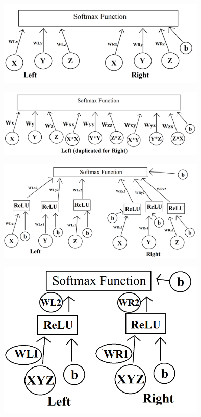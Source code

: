 \documentclass[]{report}
\begin{document}
\begin{minipage}{\linewidth}
	\begin{minipage}{0.49\textwidth}
		\centering
		\includegraphics[width=0.75\textwidth]{../images/original}
	\end{minipage}
	\hfill
	\begin{minipage}{0.49\textwidth}
		\centering
		\includegraphics[width=0.75\textwidth]{../images/complex}
	\end{minipage}
\end{minipage}
\begin{minipage}{\linewidth}
	\begin{minipage}{0.49\textwidth}
		\centering
		\includegraphics[width=0.75\textwidth]{../images/layered}
	\end{minipage}
	\hfill
	\begin{minipage}{0.49\textwidth}
		\centering
		\includegraphics[width=0.75\textwidth]{../images/xyz1}
	\end{minipage}
\end{minipage}
\\
\end{document}
